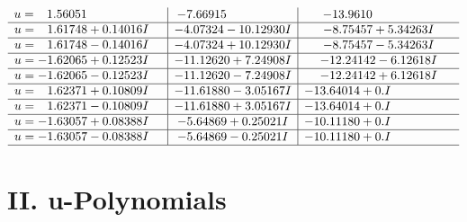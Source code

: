 \documentclass[1p]{elsarticle_modified}
\theoremstyle{definition}
\begin{document}
$$\begin{array}{c|c|c}
\begin{aligned}
u &= \phantom{-}1.56051\phantom{ +0.000000I}\end{aligned}
 & -7.66915\phantom{ +0.000000I} & -13.9610\phantom{ +0.000000I} \\ \hline\begin{aligned}
u &= \phantom{-}1.61748 + 0.14016 I\end{aligned}
 & -4.07324 - 10.12930 I & -8.75457 + 5.34263 I \\ \hline\begin{aligned}
u &= \phantom{-}1.61748 - 0.14016 I\end{aligned}
 & -4.07324 + 10.12930 I & -8.75457 - 5.34263 I \\ \hline\begin{aligned}
u &= -1.62065 + 0.12523 I\end{aligned}
 & -11.12620 + 7.24908 I & -12.24142 - 6.12618 I \\ \hline\begin{aligned}
u &= -1.62065 - 0.12523 I\end{aligned}
 & -11.12620 - 7.24908 I & -12.24142 + 6.12618 I \\ \hline\begin{aligned}
u &= \phantom{-}1.62371 + 0.10809 I\end{aligned}
 & -11.61880 - 3.05167 I & -13.64014 + 0. I\phantom{ +0.000000I} \\ \hline\begin{aligned}
u &= \phantom{-}1.62371 - 0.10809 I\end{aligned}
 & -11.61880 + 3.05167 I & -13.64014 + 0. I\phantom{ +0.000000I} \\ \hline\begin{aligned}
u &= -1.63057 + 0.08388 I\end{aligned}
 & -5.64869 + 0.25021 I & -10.11180 + 0. I\phantom{ +0.000000I} \\ \hline\begin{aligned}
u &= -1.63057 - 0.08388 I\end{aligned}
 & -5.64869 - 0.25021 I & -10.11180 + 0. I\phantom{ +0.000000I}\\
 \hline 
 \end{array}$$\newpage
\newpage\renewcommand{\arraystretch}{1}
\centering \section*{ II. u-Polynomials}
\end{document}
